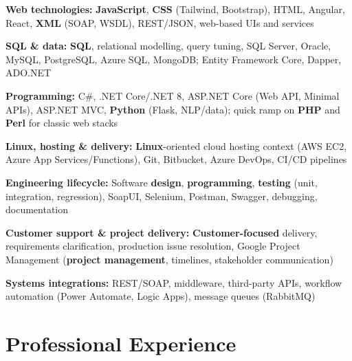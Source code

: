 \documentclass[letterpaper,10pt]{article}
\newenvironment{resume_list}{
  \vspace{-7pt}
  \begin{itemize}[itemsep=-2px, parsep=1pt, leftmargin=30pt]
}{
  \end{itemize}
}
\begin{document}
\begin{resume_list}
    \item \textbf{Web technologies:} \textbf{JavaScript}, \textbf{CSS} (Tailwind, Bootstrap), HTML, Angular, React, \textbf{XML} (SOAP, WSDL), REST/JSON, web-based UIs and services
    \item \textbf{SQL \& data:} \textbf{SQL}, relational modelling, query tuning, SQL Server, Oracle, MySQL, PostgreSQL, Azure SQL, MongoDB; Entity Framework Core, Dapper, ADO.NET
    \item \textbf{Programming:} C\#, .NET Core/.NET 8, ASP.NET Core (Web API, Minimal APIs), ASP.NET MVC, \textbf{Python} (Flask, NLP/data); quick ramp on \textbf{PHP} and \textbf{Perl} for classic web stacks
    \item \textbf{Linux, hosting \& delivery:} \textbf{Linux}-oriented cloud hosting context (AWS EC2, Azure App Services/Functions), Git, Bitbucket, Azure DevOps, CI/CD pipelines
    \item \textbf{Engineering lifecycle:} Software \textbf{design}, \textbf{programming}, \textbf{testing} (unit, integration, regression), SoapUI, Selenium, Postman, Swagger, debugging, documentation
    \item \textbf{Customer support \& project delivery:} \textbf{Customer-focused} delivery, requirements clarification, production issue resolution, Google Project Management (\textbf{project management}, timelines, stakeholder communication)
    \item \textbf{Systems integrations:} REST/SOAP, middleware, third-party APIs, workflow automation (Power Automate, Logic Apps), message queues (RabbitMQ)
\end{resume_list}

\section{Professional Experience}
\end{document}
